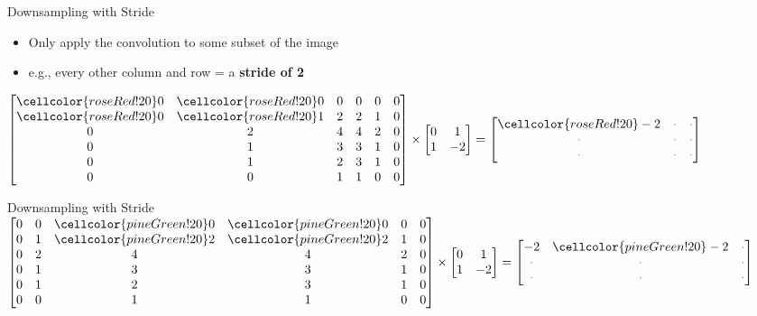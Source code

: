 \documentclass[aspectratio=169,xcolor=dvipsnames,svgnames,x11names,fleqn]{beamer}
\begin{document}
\begin{frame}[fragile]{Downsampling with Stride}
\begin{itemize}
    \item Only apply the convolution to some subset of the image
    \item e.g., every other column and row = a \textcolor{roseRed}{\textbf{stride of 2}}
\end{itemize}
\vspace{0.3cm}
\centering
\renewcommand{\arraystretch}{1.2}
$ \begin{bmatrix}
    \cellcolor{roseRed!20}0 & \cellcolor{roseRed!20}0 & 0 & 0 & 0 & 0 \\
    \cellcolor{roseRed!20}0 & \cellcolor{roseRed!20}1 & 2 & 2 & 1 & 0 \\
    0 & 2 & 4 & 4 & 2 & 0 \\
    0 & 1 & 3 & 3 & 1 & 0 \\
    0 & 1 & 2 & 3 & 1 & 0 \\
    0 & 0 & 1 & 1 & 0 & 0
    \end{bmatrix} \times \begin{bmatrix} 0 & 1 \\ 1 & -2 \end{bmatrix} =  
    \begin{bmatrix} 
    \cellcolor{roseRed!20}-2 & \textcolor{gray}{\cdot} & \textcolor{gray}{\cdot} \\ 
    \textcolor{gray}{\cdot} & \textcolor{gray}{\cdot} & \textcolor{gray}{\cdot} \\ 
    \textcolor{gray}{\cdot} & \textcolor{gray}{\cdot} & \textcolor{gray}{\cdot} 
    \end{bmatrix} $
\end{frame}    

\begin{frame}[fragile]{Downsampling with Stride}
\centering
\vspace{0.5cm}
\renewcommand{\arraystretch}{1.2}
$ \begin{bmatrix}
    0 & 0 & \cellcolor{pineGreen!20}0 & \cellcolor{pineGreen!20}0 & 0 & 0 \\
    0 & 1 & \cellcolor{pineGreen!20}2 & \cellcolor{pineGreen!20}2 & 1 & 0 \\
    0 & 2 & 4 & 4 & 2 & 0 \\
    0 & 1 & 3 & 3 & 1 & 0 \\
    0 & 1 & 2 & 3 & 1 & 0 \\
    0 & 0 & 1 & 1 & 0 & 0
    \end{bmatrix} \times \begin{bmatrix} 0 & 1 \\ 1 & -2 \end{bmatrix} =   
    \begin{bmatrix} 
    -2 & \cellcolor{pineGreen!20}-2 & \textcolor{gray}{\cdot} \\ 
    \textcolor{gray}{\cdot} & \textcolor{gray}{\cdot} & \textcolor{gray}{\cdot} \\ 
    \textcolor{gray}{\cdot} & \textcolor{gray}{\cdot} & \textcolor{gray}{\cdot} 
    \end{bmatrix} $
\end{frame}    
    
\end{document}
